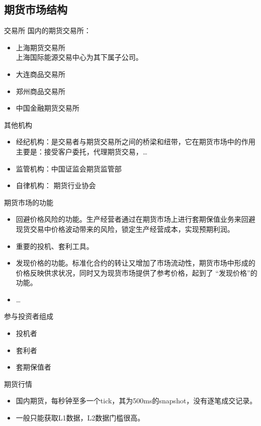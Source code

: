 \documentclass{beamer}
\begin{document}
\subsection{期货市场结构}
\begin{frame}{交易所}
  国内的期货交易所：
  \begin{itemize}
    \item  上海期货交易所\\
      上海国际能源交易中心为其下属子公司。
    \item  大连商品交易所
    \item  郑州商品交易所
    \item  中国金融期货交易所
  \end{itemize}
\end{frame}
\begin{frame}{其他机构}
  \begin{itemize}
    \item 经纪机构：是交易者与期货交易所之间的桥梁和纽带，它在期货市场中的作用主要是：接受客户委托，代理期货交易，\ldots \\
    \item 监管机构：中国证监会期货监管部
    \item 自律机构： 期货行业协会
  \end{itemize}
\end{frame}
\begin{frame}{期货市场的功能}
  \begin{itemize}
    \item 回避价格风险的功能。生产经营者通过在期货市场上进行套期保值业务来回避现货交易中价格波动带来的风险，锁定生产经营成本，实现预期利润。
    \item 重要的投机、套利工具。
    \item 发现价格的功能。标准化合约的转让又增加了市场流动性，期货市场中形成的价格反映供求状况，同时又为现货市场提供了参考价格，起到了 ``发现价格''的功能。
    \item \ldots
  \end{itemize}
\end{frame}
\begin{frame}{参与投资者组成}
  \begin{itemize}
    \item 投机者
    \item 套利者
    \item 套期保值者
  \end{itemize}
\end{frame}
\begin{frame}{期货行情}
  \begin{itemize}
    \item 国内期货，每秒钟至多一个tick，其为500ms的snapshot，没有逐笔成交记录。
    \item 一般只能获取L1数据，L2数据门槛很高。
  \end{itemize}
\end{frame}
\end{document}
